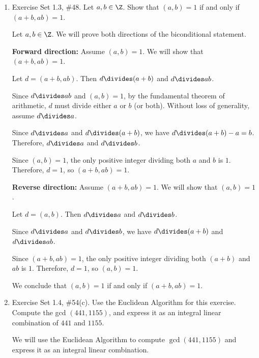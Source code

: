 \begin{enumerate}
\begin{enumerate}
\begin{subanswer}
      Therefore, if $a_1, \ldots, a_n \in \Z$ are pairwise relatively prime and each $a_j \divides c$, then $a_1 \cdots a_n \divides c$.
    \end{subanswer}
  \end{enumerate}

  \newpage

  \item Exercise Set 1.3, \#48. Let $a,b\in \Z$. Show that $(a,b)=1$ if and only if $(a+b,ab) = 1$.
  \begin{subanswer}
    Let $a,b \in \Z$. We will prove both directions of the biconditional statement.
    
    \textbf{Forward direction:} Assume $(a,b) = 1$. We will show that $(a+b,ab) = 1$.
    
    Let $d = (a+b,ab)$. Then $d \divides (a+b)$ and $d \divides ab$.
    
    Since $d \divides ab$ and $(a,b) = 1$, by the fundamental theorem of arithmetic, $d$ must divide either $a$ or $b$ (or both). Without loss of generality, assume $d \divides a$.
    
    Since $d \divides a$ and $d \divides (a+b)$, we have $d \divides (a+b) - a = b$. Therefore, $d \divides a$ and $d \divides b$.
    
    Since $(a,b) = 1$, the only positive integer dividing both $a$ and $b$ is $1$. Therefore, $d = 1$, so $(a+b,ab) = 1$.
    
    \textbf{Reverse direction:} Assume $(a+b,ab) = 1$. We will show that $(a,b) = 1$.
    
    Let $d = (a,b)$. Then $d \divides a$ and $d \divides b$.
    
    Since $d \divides a$ and $d \divides b$, we have $d \divides (a+b)$ and $d \divides ab$.
    
    Since $(a+b,ab) = 1$, the only positive integer dividing both $(a+b)$ and $ab$ is $1$. Therefore, $d = 1$, so $(a,b) = 1$.
    
    We conclude that $(a,b) = 1$ if and only if $(a+b,ab) = 1$.
  \end{subanswer}

  \newpage

  \item Exercise Set 1.4, \#54(c). Use the Euclidean Algorithm for this exercise. Compute the gcd $(441,1155)$, and express it as an integral linear combination of $441$ and $1155$.
  \begin{subanswer}
    We will use the Euclidean Algorithm to compute $\gcd(441,1155)$ and express it as an integral linear combination.
    

\end{subanswer}
\end{enumerate}
